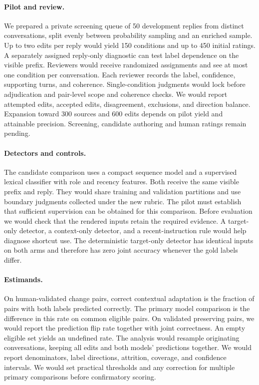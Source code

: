 \documentclass[11pt]{article}
\begin{document}
\paragraph{Pilot and review.} We prepared a private screening queue of 50 development replies from distinct conversations, split evenly between probability sampling and an enriched sample. Up to two edits per reply would yield 150 conditions and up to 450 initial ratings. A separately assigned reply-only diagnostic can test label dependence on the visible prefix. Reviewers would receive randomized assignments and see at most one condition per conversation. Each reviewer records the label, confidence, supporting turns, and coherence. Single-condition judgments would lock before adjudication and pair-level scope and coherence checks. We would report attempted edits, accepted edits, disagreement, exclusions, and direction balance. Expansion toward 300 sources and 600 edits depends on pilot yield and attainable precision. Screening, candidate authoring and human ratings remain pending.

\paragraph{Detectors and controls.} The candidate comparison uses a compact sequence model and a supervised lexical classifier with role and recency features. Both receive the same visible prefix and reply. They would share training and validation partitions and use boundary judgments collected under the new rubric. The pilot must establish that sufficient supervision can be obtained for this comparison. Before evaluation we would check that the rendered inputs retain the required evidence. A target-only detector, a context-only detector, and a recent-instruction rule would help diagnose shortcut use. The deterministic target-only detector has identical inputs on both arms and therefore has zero joint accuracy whenever the gold labels differ.

\paragraph{Estimands.} On human-validated change pairs, correct contextual adaptation is the fraction of pairs with both labels predicted correctly. The primary model comparison is the difference in this rate on common eligible pairs. On validated preserving pairs, we would report the prediction flip rate together with joint correctness. An empty eligible set yields an undefined rate. The analysis would resample originating conversations, keeping all edits and both models' predictions together. We would report denominators, label directions, attrition, coverage, and confidence intervals. We would set practical thresholds and any correction for multiple primary comparisons before confirmatory scoring.
\end{document}
